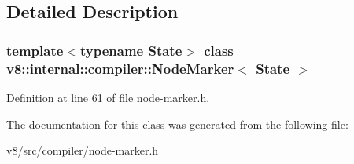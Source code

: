 \subsection{Detailed Description}
\subsubsection*{template$<$typename State$>$\newline
class v8\+::internal\+::compiler\+::\+Node\+Marker$<$ State $>$}



Definition at line 61 of file node-\/marker.\+h.



The documentation for this class was generated from the following file\+:\begin{DoxyCompactItemize}
\item 
v8/src/compiler/node-\/marker.\+h\end{DoxyCompactItemize}
